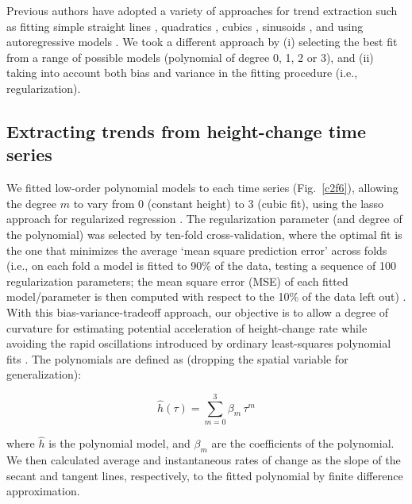 Previous authors have adopted a variety of approaches for trend extraction such as fitting simple straight lines \parencite{Pritchard2012, Shepherd2010}, quadratics \parencite{Wingham2009}, cubics \parencite{Schenk2012}, sinusoids \parencite{Zwally2005}, and using autoregressive models \parencite{Davis2005}. We took a different approach by (i) selecting the best fit from a range of possible models (polynomial of degree 0, 1, 2 or 3), and (ii) taking into account both bias and variance in the fitting procedure (i.e., regularization).

\subsection{Extracting trends from height-change time series}

We fitted low-order polynomial models to each time series (Fig.~\ref{c2f6}), allowing the degree $m$ to vary from 0 (constant height) to 3 (cubic fit), using the lasso approach for regularized regression \parencite{Tibshirani1996}. The regularization parameter (and degree of the polynomial) was selected by ten-fold cross-validation, where the optimal fit is the one that minimizes the average `mean square prediction error' across folds (i.e., on each fold a model is fitted to 90\% of the data, testing a sequence of 100 regularization parameters; the mean square error (MSE) of each fitted model/parameter is then computed with respect to the 10\% of the data left out) \parencite{Friedman2010}. With this bias-variance-tradeoff approach, our objective is to allow a degree of curvature for estimating potential acceleration of height-change rate while avoiding the rapid oscillations introduced by ordinary least-squares polynomial fits \parencite{Paolo2015}. The polynomials are defined as (dropping the spatial variable for generalization):

\begin{equation}
  \hat h(\tau) = \sum_{m=0}^3 \beta_m \, \tau^m
  \label{c2e5}
\end{equation}

\noindent
where $\hat h$ is the polynomial model, and $\beta_m$ are the coefficients of the polynomial. We then calculated average and instantaneous rates of change as the slope of the secant and tangent lines, respectively, to the fitted polynomial by finite difference approximation. 

